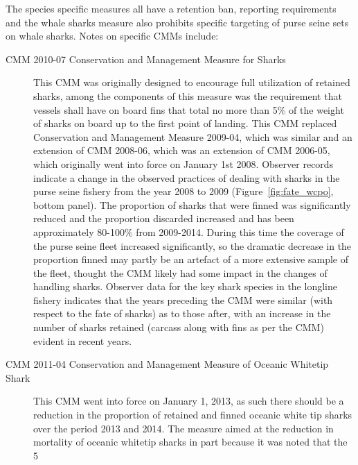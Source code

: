 \documentclass[12pt]{SCreport}
\begin{document}
The species specific measures all have a retention ban, reporting requirements and the whale sharks measure also prohibits specific targeting of purse seine sets on whale sharks. Notes on specific CMMs include:
\begin{description}
 \item[CMM 2010-07 Conservation and Management Measure for Sharks] This CMM was originally designed to encourage full utilization of retained sharks, among the components of this measure was the requirement that vessels shall have on board fins that total no more than 5\% of the weight of sharks on board up to the first point of landing. This CMM replaced Conservation and Management Measure 2009-04, which was similar and an extension of CMM 2008-06, which was an extension of CMM 2006-05, which originally went into force on January 1st 2008. Observer records indicate a change in the observed practices of dealing with sharks in the purse seine fishery from the year 2008 to 2009 (Figure~\ref{fig:fate_wcpo}, bottom panel). 
The proportion of sharks that were finned was significantly reduced and the proportion discarded increased and has been approximately 80-100\% from 2009-2014. During this time the coverage of the purse seine fleet increased significantly, so the dramatic decrease in the proportion finned may partly be an artefact of a more extensive sample of the fleet, thought the CMM likely had some impact in the changes of handling sharks. Observer data for the key shark species in the longline fishery indicates that the years preceding the CMM were similar (with respect to the fate of sharks) as to those after, with an increase in the number of sharks retained (carcass along with fins as per the CMM) evident in recent years.
 
 
 \item[CMM 2011-04 Conservation and Management Measure of Oceanic Whitetip Shark] This CMM went into force on January 1, 2013, as such there should be a reduction in the proportion of retained and finned oceanic white tip sharks over the period 2013 and 2014. The measure aimed at the reduction in mortality of oceanic whitetip sharks in part because it was noted that the 5%



\end{description}
\end{document}
